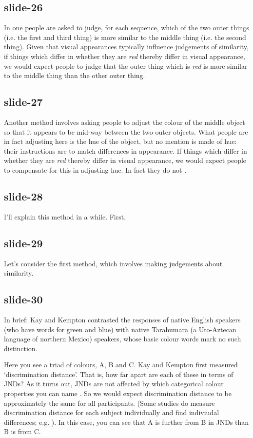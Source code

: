 \documentclass[12pt,\papersize]{extarticle}
\begin{document}
\subsection{slide-26}
In one people are asked to judge, for each sequence, which of the two outer things (i.e. the first and third thing) is more similar to the middle thing (i.e. the second thing).
Given that visual appearances typically influence judgements of similarity,
if things which differ in whether they are \emph{red} thereby differ in visual appearance, we would expect people to judge that the outer thing which is
\emph{red} is more similar to the middle thing than the other outer thing.

\subsection{slide-27}
Another method involves asking people to adjust the colour of the middle object so that it appears to be mid-way between the two outer objects.
What people  are in fact adjusting here is the hue of the object, but no mention is made of hue: their instructions are to match differences in appearance.
If things which differ in whether they are \emph{red} thereby differ in visual appearance, we would expect people to compensate for this in adjusting hue.
In fact they do not \citep{witzel2014category}.

\subsection{slide-28}
I’ll explain this method in a while.
First,

\subsection{slide-29}
Let’s consider the first method, which involves
making judgements about similarity.

\subsection{slide-30}
In brief: Kay and Kempton contrasted the responses of native English
speakers (who have words for green and blue) with native Tarahumara (a Uto-Aztecan language of
northern Mexico) speakers, whose basic colour words mark no such distinction.

Here you see a triad of colours, A, B and C.
Kay and Kempton first measured ‘discrimination distance’.
That is, how far apart are each of these in terms of JNDs?
As it turns out, JNDs are not affected by which categorical colour properties you can name
\citep{witzel:2013_categorical}.
So we would expect discrimination distance to be approximately the same for all
participants. (Some studies do measure discrimination distance for
each subject individually and find indiviudal differences; e.g. \citep{witzel:2014_categorical}).
In this case, you can see that A is further from B in JNDs than B is from C.
\end{document}
